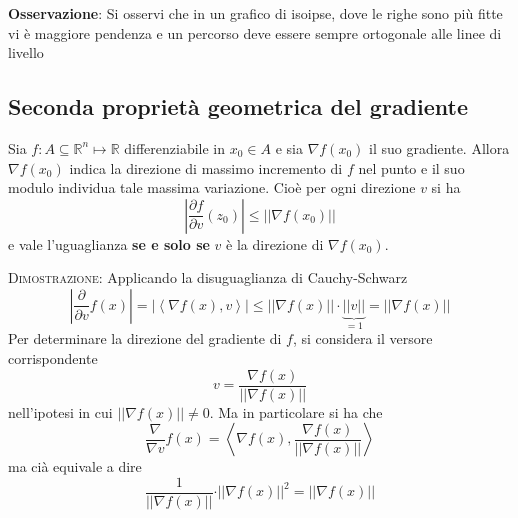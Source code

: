 \documentclass[a4paper]{extarticle}
\begin{document}
\vspace{2em}
\noindent
\textbf{Osservazione}: Si osservi che in un grafico di isoipse, dove le righe sono più fitte vi è maggiore pendenza e un percorso deve essere sempre ortogonale alle linee di livello

\vspace{1em}
\noindent
\subsection{Seconda proprietà geometrica del gradiente}
Sia $f : A \subseteq \mathbb{R}^n \longmapsto \mathbb{R}$ differenziabile in $x_0 \in A$ e sia $\nabla f(x_0)$ il suo gradiente. Allora $\nabla f(x_0)$ indica la direzione di massimo incremento di $f$ nel punto e il suo modulo individua tale massima variazione. Cioè per ogni direzione $v$ si ha
\[\left \vert \frac{\partial f}{\partial v}(z_0) \right \vert \leq \left \vert \left \vert \nabla f(x_0) \right \vert \right \vert\]
e vale l'uguaglianza \textbf{se e solo se} $v$ è la direzione di $\nabla f(x_0)$.

\vspace{2em}
\noindent
\normalfont \normalsize
\textsc{Dimostrazione}: Applicando la disuguaglianza di Cauchy-Schwarz
\[\left \vert \frac{\partial}{\partial v} f(x) \right \vert = \left \vert \left<\nabla f(x), v \right> \right \vert \leq \vert \vert \nabla f(x) \vert \vert \cdot \underbrace{\vert \vert v \vert \vert}_{=1} = \vert \vert \nabla f(x) \vert \vert\]
Per determinare la direzione del gradiente di $f$, si considera il versore corrispondente
\[v=\frac{\nabla f(x)}{\vert \vert \nabla f(x) \vert \vert}\]
nell'ipotesi in cui $\vert \vert \nabla f(x) \vert \vert \neq 0$. Ma in particolare si ha che
\[\frac{\nabla}{\nabla v} f(x) = \left<\nabla f(x), \frac{\nabla f(x)}{\vert \vert \nabla f(x) \vert \vert}\right>\]
ma cià equivale a dire
\[\frac{1}{\vert \vert \nabla f(x) \vert \vert} \cdot \vert \vert \nabla f(x) \vert \vert^2 = \vert \vert \nabla f(x) \vert \vert\]
\end{document}
